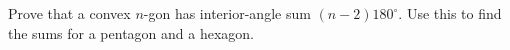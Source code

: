 Prove that a convex $n$-gon has interior-angle sum $(n-2)180^\circ$. Use this to find the sums for a pentagon and a hexagon.
